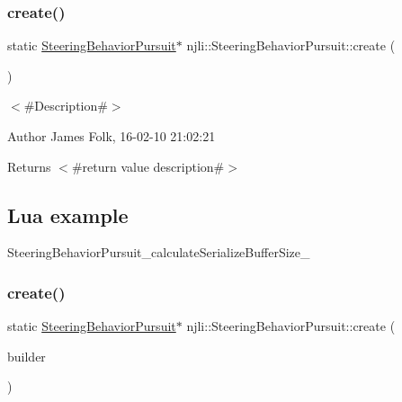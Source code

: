 \subsubsection{\texorpdfstring{create()}{create()}\hspace{0.1cm}{\footnotesize\ttfamily [1/2]}}
{\footnotesize\ttfamily static \mbox{\hyperlink{classnjli_1_1_steering_behavior_pursuit}{Steering\+Behavior\+Pursuit}}$\ast$ njli\+::\+Steering\+Behavior\+Pursuit\+::create (\begin{DoxyParamCaption}{ }\end{DoxyParamCaption})\hspace{0.3cm}{\ttfamily [static]}}



$<$\#\+Description\#$>$ 

\begin{DoxyAuthor}{Author}
James Folk, 16-\/02-\/10 21\+:02\+:21
\end{DoxyAuthor}
\begin{DoxyReturn}{Returns}
$<$\#return value description\#$>$
\end{DoxyReturn}
\hypertarget{classnjli_1_1_steering_behavior_wander_ex1}{}\subsection{Lua example}\label{classnjli_1_1_steering_behavior_wander_ex1}

\begin{DoxyCodeInclude}
\end{DoxyCodeInclude}
Steering\+Behavior\+Pursuit\+\_\+calculate\+Serialize\+Buffer\+Size\+\_\+ \mbox{\label{classnjli_1_1_steering_behavior_pursuit_aa20d6fa6c0a7017b155268fe441098e0}} 
\subsubsection{\texorpdfstring{create()}{create()}\hspace{0.1cm}{\footnotesize\ttfamily [2/2]}}
{\footnotesize\ttfamily static \mbox{\hyperlink{classnjli_1_1_steering_behavior_pursuit}{Steering\+Behavior\+Pursuit}}$\ast$ njli\+::\+Steering\+Behavior\+Pursuit\+::create (\begin{DoxyParamCaption}\item[{const \mbox{\hyperlink{classnjli_1_1_steering_behavior_pursuit_builder}{Steering\+Behavior\+Pursuit\+Builder}} \&}]{builder }\end{DoxyParamCaption})\hspace{0.3cm}{\ttfamily [static]}}



